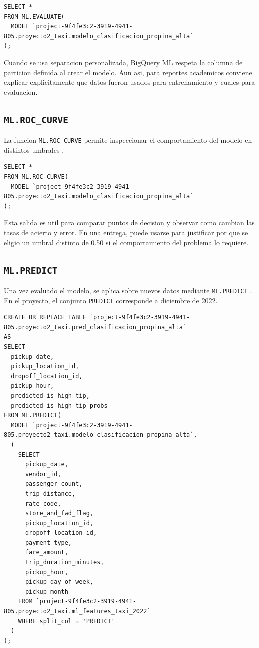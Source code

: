 \documentclass[12pt]{article}
\begin{document}
\begin{lstlisting}[style=sql]
SELECT *
FROM ML.EVALUATE(
  MODEL `project-9f4fe3c2-3919-4941-805.proyecto2_taxi.modelo_clasificacion_propina_alta`
);
\end{lstlisting}

Cuando se usa separacion personalizada, BigQuery ML respeta la columna de particion definida al crear el modelo. Aun asi, para reportes academicos conviene explicar explicitamente que datos fueron usados para entrenamiento y cuales para evaluacion.

\subsection{\texttt{ML.ROC\_CURVE}}
La funcion \texttt{ML.ROC\_CURVE} permite inspeccionar el comportamiento del modelo en distintos umbrales \cite{gcp_roc_curve}.

\begin{lstlisting}[style=sql]
SELECT *
FROM ML.ROC_CURVE(
  MODEL `project-9f4fe3c2-3919-4941-805.proyecto2_taxi.modelo_clasificacion_propina_alta`
);
\end{lstlisting}

Esta salida es util para comparar puntos de decision y observar como cambian las tasas de acierto y error. En una entrega, puede usarse para justificar por que se eligio un umbral distinto de 0.50 si el comportamiento del problema lo requiere.

\subsection{\texttt{ML.PREDICT}}
Una vez evaluado el modelo, se aplica sobre nuevos datos mediante \texttt{ML.PREDICT} \cite{gcp_predict}. En el proyecto, el conjunto \texttt{PREDICT} corresponde a diciembre de 2022.

\begin{lstlisting}[style=sql]
CREATE OR REPLACE TABLE `project-9f4fe3c2-3919-4941-805.proyecto2_taxi.pred_clasificacion_propina_alta`
AS
SELECT
  pickup_date,
  pickup_location_id,
  dropoff_location_id,
  pickup_hour,
  predicted_is_high_tip,
  predicted_is_high_tip_probs
FROM ML.PREDICT(
  MODEL `project-9f4fe3c2-3919-4941-805.proyecto2_taxi.modelo_clasificacion_propina_alta`,
  (
    SELECT
      pickup_date,
      vendor_id,
      passenger_count,
      trip_distance,
      rate_code,
      store_and_fwd_flag,
      pickup_location_id,
      dropoff_location_id,
      payment_type,
      fare_amount,
      trip_duration_minutes,
      pickup_hour,
      pickup_day_of_week,
      pickup_month
    FROM `project-9f4fe3c2-3919-4941-805.proyecto2_taxi.ml_features_taxi_2022`
    WHERE split_col = 'PREDICT'
  )
);
\end{lstlisting}
\end{document}
